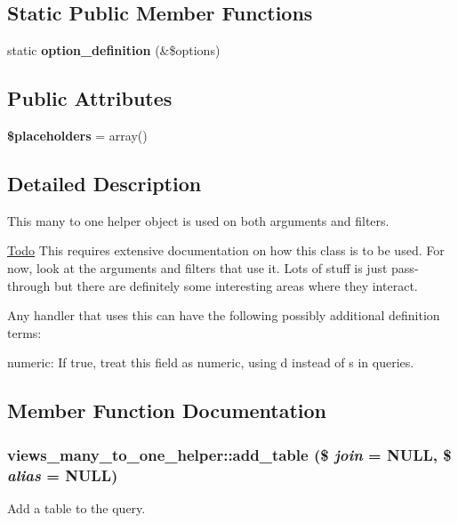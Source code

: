 \subsection*{Static Public Member Functions}
\begin{DoxyCompactItemize}
\item 
\hypertarget{classviews__many__to__one__helper_ad2626cf8f80c88ff1665b95db7845879}{
static {\bfseries option\_\-definition} (\&\$options)}
\label{classviews__many__to__one__helper_ad2626cf8f80c88ff1665b95db7845879}

\end{DoxyCompactItemize}
\subsection*{Public Attributes}
\begin{DoxyCompactItemize}
\item 
\hypertarget{classviews__many__to__one__helper_af6c91b7adad9bf8fab065060875f613d}{
{\bfseries \$placeholders} = array()}
\label{classviews__many__to__one__helper_af6c91b7adad9bf8fab065060875f613d}

\end{DoxyCompactItemize}


\subsection{Detailed Description}
This many to one helper object is used on both arguments and filters.

\begin{Desc}
\item[\hyperlink{todo__todo000052}{Todo}]This requires extensive documentation on how this class is to be used. For now, look at the arguments and filters that use it. Lots of stuff is just pass-\/through but there are definitely some interesting areas where they interact.\end{Desc}
Any handler that uses this can have the following possibly additional definition terms:
\begin{DoxyItemize}
\item numeric: If true, treat this field as numeric, using d instead of s in queries. 
\end{DoxyItemize}

\subsection{Member Function Documentation}
\hypertarget{classviews__many__to__one__helper_a0d8f88cfcc6bbb792c0fd0b3e1f42882}{
\subsubsection[{add\_\-table}]{\setlength{\rightskip}{0pt plus 5cm}views\_\-many\_\-to\_\-one\_\-helper::add\_\-table (\$ {\em join} = {\ttfamily NULL}, \/  \$ {\em alias} = {\ttfamily NULL})}}
\label{classviews__many__to__one__helper_a0d8f88cfcc6bbb792c0fd0b3e1f42882}
Add a table to the query.

